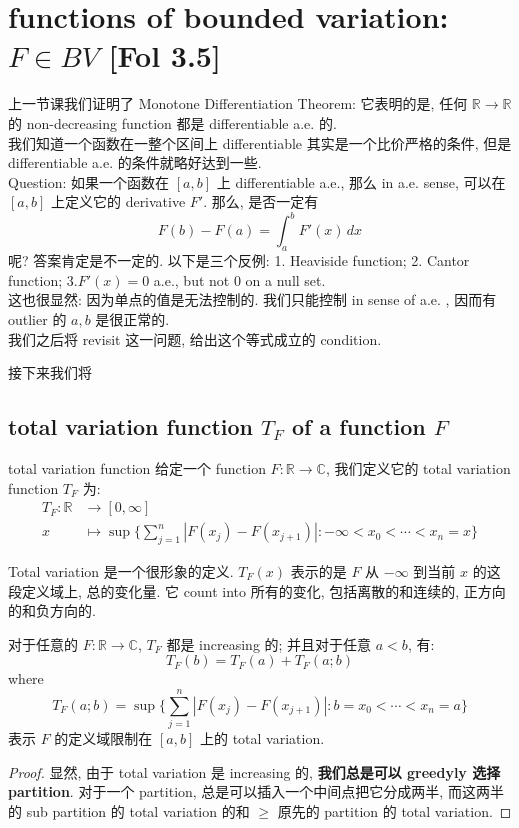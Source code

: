 \documentclass[lang=cn,11pt]{elegantbook}
\begin{document}
\chapter{functions of bounded variation: $F\in BV$ [Fol 3.5]}
上一节课我们证明了 Monotone Differentiation Theorem: 它表明的是, 任何 $\mathbb{R}\to \mathbb{R}$ 的 non-decreasing function 都是 differentiable a.e. 的.\\
我们知道一个函数在一整个区间上 differentiable 其实是一个比价严格的条件, 但是 differentiable a.e. 的条件就略好达到一些.\\
Question: 如果一个函数在 $[a,b] $ 上 differentiable a.e., 那么 in a.e. sense, 可以在 $[a,b] $ 上定义它的 derivative $F'$. 那么, 是否一定有 \[
F(b)  - F(a)  = \int_a^b F'(x) \, dx
\]呢? 答案肯定是不一定的. 以下是三个反例: 1. Heaviside function; 2. Cantor function; 3.$F'(x) = 0$ a.e., but not $0$ on a null set.\\
这也很显然: 因为单点的值是无法控制的. 我们只能控制 in sense of a.e. , 因而有 outlier 的 $a,b$ 是很正常的.\\
我们之后将 revisit 这一问题, 给出这个等式成立的 condition.

接下来我们将


\section{total variation function $T_F$ of a function $F$}
\begin{definition}{total variation function}
    给定一个 function $F:\mathbb{R}\to \mathbb{C}$, 我们定义它的 total variation function $T_F$ 为:\begin{align*}
        T_F : \mathbb{R} &\to [0,\infty]\\
        x &\mapsto \sup \{     \sum_{j=1}^n | F(x_j) - F(x_{j+1})| : -\infty <  x_0 < \cdots < x_n  = x    \} 
    \end{align*}
\end{definition}
\begin{remark}
    Total variation 是一个很形象的定义. $T_F(x)$ 表示的是 $F$ 从 $-\infty$ 到当前 $x$ 的这段定义域上, 总的变化量. 它 count into 所有的变化, 包括离散的和连续的, 正方向的和负方向的.\\
\end{remark}

\begin{lemma}
 对于任意的 $F:\mathbb{R}\to \mathbb{C}$,  $T_F$ 都是 increasing 的; 并且对于任意 $a<b$, 有: \[
 T_F(b) =  T_F(a) + T_F(a;b)
 \]
 where \[
 T_F (a;b) = \sup\{\sum_{j=1}^n  | F(x_j) - F(x_{j+1})| : b =  x_0 < \cdots < x_n  = a \}
 \]
表示 $F$ 的定义域限制在 $[a,b]$ 上的 total variation. 
\end{lemma}
\begin{proof}
    显然, 由于 total variation 是 increasing 的,  \textbf{我们总是可以 greedyly 选择 partition}. 对于一个 partition, 总是可以插入一个中间点把它分成两半, 而这两半的 sub partition 的 total variation 的和 $\geq$ 原先的 partition 的 total variation.
\end{proof}
\end{document}
